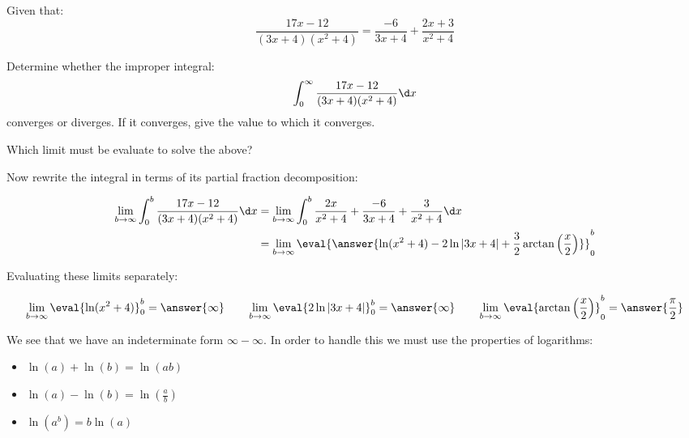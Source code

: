 \documentclass{ximera}
\author{Jim Talamo}
\begin{document}
\begin{exercise}
Given that: 
\[ \dfrac{17x-12}{(3x+4)(x^2+4)} = \dfrac{-6}{3x+4} + \dfrac{2x+3}{x^2+4} \]

Determine whether the improper integral:
\[ \displaystyle \int_0^{\infty} \dfrac{17x-12}{(3x+4)(x^2+4)} \d x \]
 converges or diverges.  If it converges, give the value to which it converges.  

Which limit must be evaluate to solve the above?

\begin{multipleChoice}
\end{multipleChoice}

\begin{exercise}

Now rewrite the integral in terms of its partial fraction decomposition:

\begin{align*}
\lim_{b\rightarrow \infty} \int_{0}^{b}
\frac{17x-12}{(3x+4)(x^2+4)} \d x&=
\lim_{b\rightarrow \infty} \int_{0}^{b}
 \frac{2x}{x^2+4}+
\frac{-6}{3x+4}+
\frac{3}{x^2+4}  \d x \\
&= \lim_{b\rightarrow \infty} \eval{ \answer{\ln(x^2+4)-2 \ln|3x+4|+\frac{3}{2} \arctan\left(\frac{x}{2}\right)}}_0^b
\end{align*}




\begin{exercise}

Evaluating these limits separately:

\[ \lim_{b\rightarrow \infty} \eval{\ln(x^2+4)}_0^b = \answer{\infty}  \qquad   \lim_{b\rightarrow \infty} \eval{2 \ln|3x+4|}_0^b = \answer{\infty}   \qquad    \lim_{b\rightarrow \infty} \eval{ \arctan\left(\frac{x}{2}\right)}_0^b = \answer{\frac{\pi}{2}} \]

\begin{exercise}
We see that we have an indeterminate form $\infty - \infty$.  In order to handle this we must use the properties of logarithms:

\begin{itemize}
\item $\ln(a)+\ln(b) = \ln(ab)$
\item $\ln(a)-\ln(b) = \ln\left(\frac{a}{b}\right)$
\item $\ln\left(a^b\right) = b \ln(a)$
\end{itemize}


\end{exercise}
\end{exercise}
\end{exercise}
\end{exercise}
\end{document}
